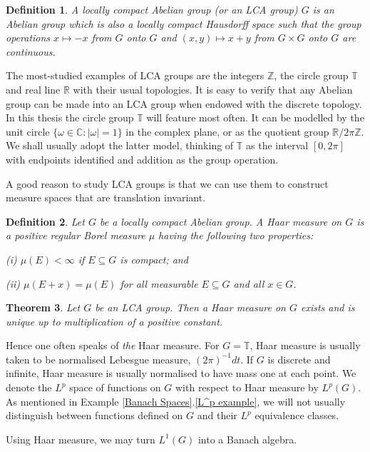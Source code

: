 \documentclass[mstat,12pt]{unswthesis}  %
\newcommand{\R}{\mathbb{R}}
\newcommand{\C}{\mathbb{C}}
\newcommand{\T}{\mathbb{T}}
\newcommand{\Z}{\mathbb{Z}}
\newcommand{\reff}[2]{\ref{#1}.\ref{#2}}
\newtheorem{theorem}{Theorem}[section]
\newtheorem{definition}[theorem]{Definition}
\numberwithin{equation}{section}
\begin{document}
\begin{definition} A {\em locally compact Abelian group} (or an LCA group)
$G$ is an Abelian group
which is also a locally compact Hausdorff space such that the group operations
$x\mapsto -x$ from $G$ onto $G$ and $(x,y)\mapsto x+y$ from $G\times G$
onto $G$ are continuous. 
\end{definition}

The most-studied examples of LCA groups are the integers $\Z$, the circle group
$\T$ and real line $\R$ with their usual topologies. 
It is easy to verify that any Abelian group can be made into an LCA group
when endowed with the discrete topology. In this thesis the circle group $\T$
will feature most often. It can be modelled by the unit circle
$\{\omega\in\C:|\omega|=1\}$
in the complex plane, or as the quotient group $\R/2\pi\Z$. We shall usually
adopt the latter model,
thinking of $\T$ as the interval $[0,2\pi]$ with endpoints identified and
addition as the group operation.

A good reason to study LCA groups is
that we can use them to construct measure spaces that are translation invariant.

\begin{definition} Let $G$ be a locally compact Abelian group. A {\em Haar
measure} on $G$ is a positive regular Borel measure $\mu$ having the
following two properties:

(i) $\mu(E)<\infty$ if $E\subseteq G$ is compact; and

(ii) $\mu(E+x)=\mu(E)$ for all measurable $E\subseteq G$ and all $x\in G$.
\end{definition}

\begin{theorem}\cite[Chapter VII, \S 2]{Katznelson}
Let $G$ be an LCA group. Then a Haar measure on $G$ exists and is unique up to
multiplication of a positive constant.
\end{theorem}

Hence one often speaks of {\em the} Haar measure. For $G=\T$, Haar measure is
usually taken to be normalised
Lebesgue measure, $(2\pi)^{-1}dt$. If $G$ is discrete and infinite, Haar measure
is usually
normalised to have mass one at each point. We denote the $L^p$ space of
functions on $G$ with respect to Haar measure by $L^p(G)$. As mentioned in
Example \reff{Banach Spaces}{L^p example}, we will not usually distinguish
between functions defined on $G$ and their $L^p$ equivalence classes.

Using Haar measure, we may turn $L^1(G)$ into a Banach algebra.
\end{document}
